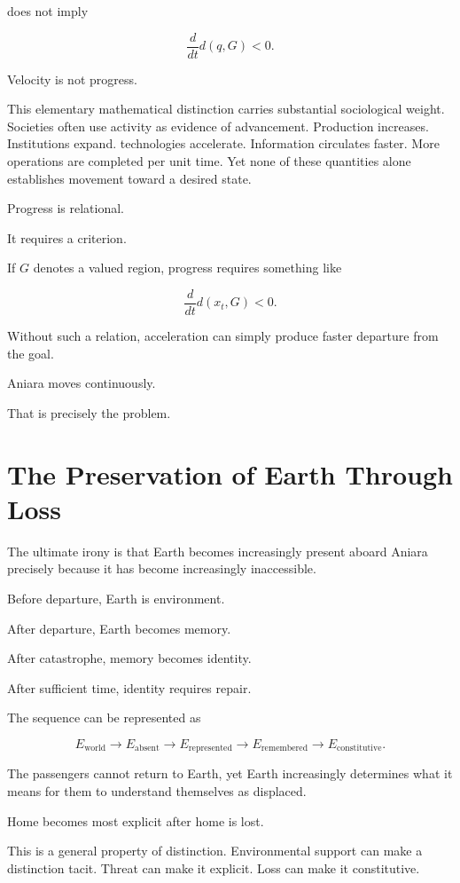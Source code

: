 \documentclass[11pt,oneside]{book}
\theoremstyle{definition}
\theoremstyle{remark}
\begin{document}
does not imply

\[
\frac{d}{dt}d(q,G)<0.
\]

Velocity is not progress.

This elementary mathematical distinction carries substantial sociological weight. Societies often use activity as evidence of advancement. Production increases. Institutions expand. technologies accelerate. Information circulates faster. More operations are completed per unit time. Yet none of these quantities alone establishes movement toward a desired state.

Progress is relational.

It requires a criterion.

If \(G\) denotes a valued region, progress requires something like

\[
\frac{d}{dt}d(x_t,G)<0.
\]

Without such a relation, acceleration can simply produce faster departure from the goal.

Aniara moves continuously.

That is precisely the problem.

\section{The Preservation of Earth Through Loss}

The ultimate irony is that Earth becomes increasingly present aboard Aniara precisely because it has become increasingly inaccessible.

Before departure, Earth is environment.

After departure, Earth becomes memory.

After catastrophe, memory becomes identity.

After sufficient time, identity requires repair.

The sequence can be represented as

\[
E_{\mathrm{world}}
\rightarrow
E_{\mathrm{absent}}
\rightarrow
E_{\mathrm{represented}}
\rightarrow
E_{\mathrm{remembered}}
\rightarrow
E_{\mathrm{constitutive}}.
\]

The passengers cannot return to Earth, yet Earth increasingly determines what it means for them to understand themselves as displaced.

Home becomes most explicit after home is lost.

This is a general property of distinction. Environmental support can make a distinction tacit. Threat can make it explicit. Loss can make it constitutive.
\end{document}
